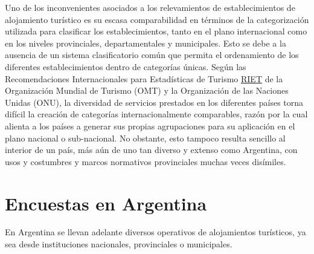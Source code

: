 \documentclass[
]{book}
\begin{document}
Uno de los inconvenientes asociados a los relevamientos de establecimientos de alojamiento turístico es su escasa comparabilidad en términos de la categorización utilizada para clasificar los establecimientos, tanto en el plano internacional como en los niveles provinciales, departamentales y municipales. Esto se debe a la ausencia de un sistema clasificatorio común que permita el ordenamiento de los diferentes establecimientos dentro de categorías únicas. Según las Recomendaciones Internacionales para Estadísticas de Turismo \href{https://unstats.un.org/unsd/publication/seriesm/seriesm_83rev1s.pdf}{RIET} de la Organización Mundial de Turismo (OMT) y la Organización de las Naciones Unidas (ONU), la diversidad de servicios prestados en los diferentes países torna difícil la creación de categorías internacionalmente comparables, razón por la cual alienta a los países a generar sus propias agrupaciones para su aplicación en el plano nacional o sub-nacional. No obstante, esto tampoco resulta sencillo al interior de un país, más aún de uno tan diverso y extenso como Argentina, con usos y costumbres y marcos normativos provinciales muchas veces disímiles.

\hypertarget{encuestas-en-argentina}{%
\section{Encuestas en Argentina}\label{encuestas-en-argentina}}

En Argentina se llevan adelante diversos operativos de alojamientos turísticos, ya sea desde instituciones nacionales, provinciales o municipales.
\end{document}
